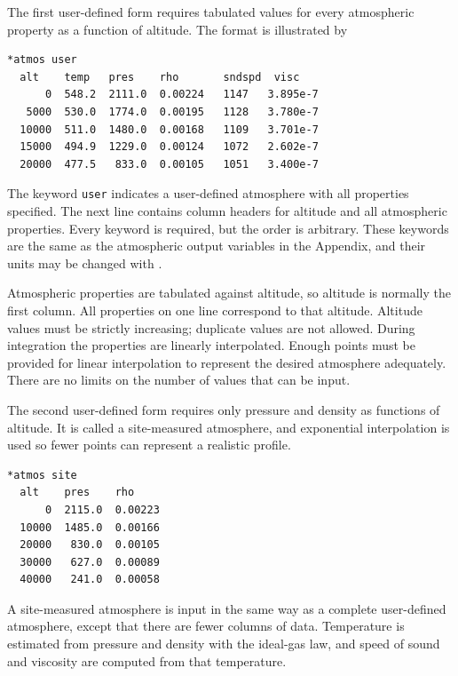 
The first user-defined form requires tabulated values for every atmospheric property
as a function of altitude. The format is illustrated by

\begin{lstlisting}[style=taosmanual]
*atmos user
  alt    temp   pres    rho       sndspd  visc
      0  548.2  2111.0  0.00224   1147   3.895e-7
   5000  530.0  1774.0  0.00195   1128   3.780e-7
  10000  511.0  1480.0  0.00168   1109   3.701e-7
  15000  494.9  1229.0  0.00124   1072   2.602e-7
  20000  477.5   833.0  0.00105   1051   3.400e-7
\end{lstlisting}

The keyword \texttt{user} indicates a user-defined atmosphere with all properties specified. The next
line contains column headers for altitude and all atmospheric properties. Every
keyword is required, but the order is arbitrary. These keywords are the same as the
atmospheric output variables in the Appendix, and their units may be changed with
.

Atmospheric properties are tabulated against altitude, so altitude is normally the
first column. All properties on one line correspond to that altitude. Altitude values
must be strictly increasing; duplicate values are not allowed. During integration the
properties are linearly interpolated. Enough points must be provided for linear
interpolation to represent the desired atmosphere adequately. There are no limits on the number of values that can be input.


The second user-defined form requires only pressure and density as functions of
altitude. It is called a site-measured atmosphere, and exponential interpolation is
used so fewer points can represent a realistic profile.

\begin{lstlisting}[style=taosmanual]
*atmos site
  alt    pres    rho
      0  2115.0  0.00223
  10000  1485.0  0.00166
  20000   830.0  0.00105
  30000   627.0  0.00089
  40000   241.0  0.00058
\end{lstlisting}

A site-measured atmosphere is input in the same way as a complete user-defined
atmosphere, except that there are fewer columns of data. Temperature is estimated
from pressure and density with the ideal-gas law, and speed of sound and viscosity
are computed from that temperature.
